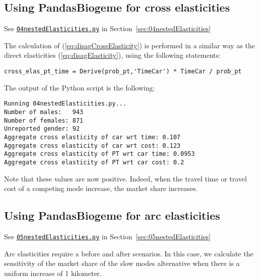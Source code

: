 \documentclass[12pt,a4paper]{article}
\newcommand{\req}[1]{(\ref{#1})}
\begin{document}
\subsection{Using PandasBiogeme for cross elasticities}

\begin{flushright}
See \href{http://biogeme.epfl.ch/examples/indicators/python/04nestedElasticities.py}{\lstinline$04nestedElasticities.py$} in Section~\ref{sec:04nestedElasticities}
\end{flushright}



The calculation of \req{eq:disagCrossElasticity} is performed in a
similar way as the direct elasticities \req{eq:disagElasticity}, using the following statements:
\begin{lstlisting}
cross_elas_pt_time = Derive(prob_pt,'TimeCar') * TimeCar / prob_pt 
\end{lstlisting}

The output of the Python script is the following:
\begin{lstlisting}
Running 04nestedElasticities.py...
Number of males:   943
Number of females: 871
Unreported gender: 92
Aggregate cross elasticity of car wrt time: 0.107
Aggregate cross elasticity of car wrt cost: 0.123
Aggregate cross elasticity of PT wrt car time: 0.0953
Aggregate cross elasticity of PT wrt car cost: 0.2
\end{lstlisting}
Note that these values are now positive. Indeed, when the travel time
or travel cost of a competing mode increase, the market share
increases.

 
\subsection{Using PandasBiogeme for arc elasticities}

\begin{flushright}
See \href{http://biogeme.epfl.ch/examples/indicators/python/05nestedElasticities.py}{\lstinline$05nestedElasticities.py$} in Section~\ref{sec:05nestedElasticities}
\end{flushright}


Arc elasticities require a before and after scenarios. In this case,
we calculate the sensitivity of the market share of the slow modes
alternative when there is a uniform increase of 1 kilometer.
\end{document}
